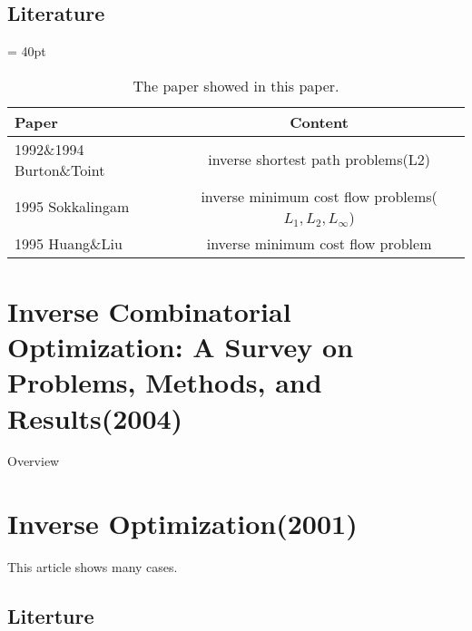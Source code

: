 \documentclass[UTF8]{article}
\begin{document}
\subsection{Literature}


\begin{table}[ht]

 \tabcolsep = 40pt

 \small\renewcommand{}

 \caption{The paper showed in this paper.\label{tab:2}}

 {\begin{tabular}{lc}
   \hline
   Paper                    & Content                                                 \\
   \hline
   1992\&1994 Burton\&Toint & inverse shortest path problems(L2)                      \\
   \hline
   1995 Sokkalingam         & inverse minimum cost flow problems($L_1,L_2,L_\infty $) \\
   \hline
   1995 Huang\&Liu          & inverse minimum cost flow problem                       \\
   \hline
  \end{tabular}}
 {}
\end{table}


\section{Inverse Combinatorial Optimization: A Survey on Problems, Methods, and Results(2004)}

Overview



\section{Inverse Optimization(2001)}

This article shows many cases.


\subsection{Literture}
\end{document}
